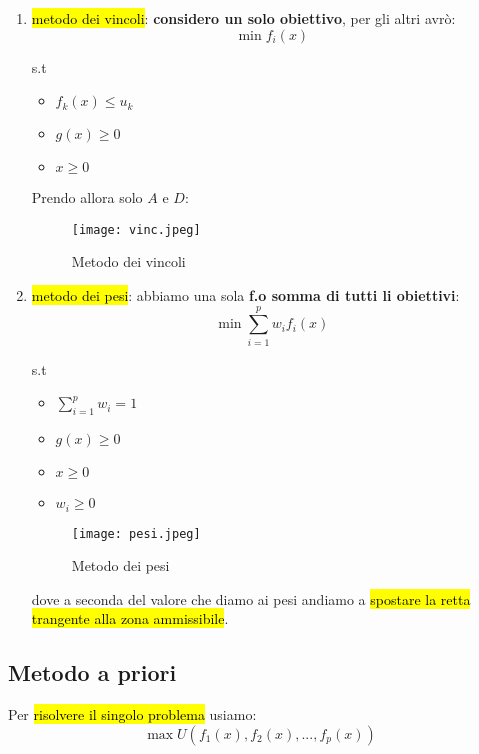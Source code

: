 \begin{enumerate}
    \item \hl{metodo dei vincoli}: \textbf{considero un solo obiettivo}, per gli altri avrò:
        $$\min f_i(x)$$
        
        s.t
        
        \begin{itemize}
            \item $f_k(x) \leq u_k$
            \item $g(x) \geq 0$
            \item $x \geq 0$
        \end{itemize}

        Prendo allora solo $A$ e $D$:

        \begin{figure}[H]
        \centering
        \texttt{[image: vinc.jpeg]}
        \caption{Metodo dei vincoli} 
        \label{vinc}
        \end{figure} 
    \item \hl{metodo dei pesi}: abbiamo una sola \textbf{f.o somma di tutti li obiettivi}:
        $$\min \sum_{i=1}^p w_i f_i (x)$$

        s.t
        
        \begin{itemize}
            \item $\sum_{i=1}^p w_i = 1$
            \item $g(x) \geq 0$
            \item $x \geq 0$
            \item $w_i \geq 0$
        \end{itemize}

        \begin{figure}[H]
        \centering
        \texttt{[image: pesi.jpeg]}
        \caption{Metodo dei pesi} 
        \label{pesi}
        \end{figure}

        dove a seconda del valore che diamo ai pesi andiamo a \hl{spostare la retta trangente alla zona ammissibile}.
\end{enumerate}


\subsection{Metodo a priori}

Per \hl{risolvere il singolo problema} usiamo:
$$\max U(f_1(x), f_2(x), ..., f_p(x))$$

